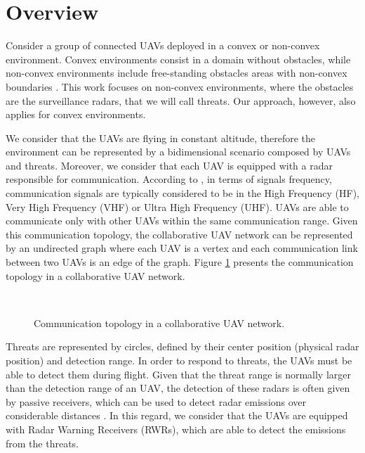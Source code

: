 \section{Overview}

Consider a group of connected UAVs deployed in a convex or non-convex environment. Convex environments consist in a domain without obstacles, while non-convex environments include  free-standing  obstacles  areas  with non-convex boundaries \cite{breitenmoser2010}. This work focuses on non-convex environments, where the obstacles are the surveillance radars, that we will call threats. Our approach, however, also applies for convex environments.

We consider that the UAVs are flying in constant altitude, therefore the environment can be represented by a bidimensional scenario composed by UAVs and threats. Moreover, we consider that each UAV is equipped with a radar responsible for communication. According to \cite{adamy2004}, in terms of signals frequency, communication signals are typically considered to be in the High Frequency (HF), Very High Frequency (VHF) or Ultra High Frequency (UHF). UAVs are able to communicate only with other UAVs within the same communication range. Given this communication topology, the collaborative UAV network can be represented by an undirected graph where each UAV is a vertex and each communication link between two UAVs is an edge of the graph. Figure \ref{fig:communicationLink} presents the communication topology in a collaborative UAV network.

\begin{figure}[hbt!]
      \centering            
         \\ \centering
       \caption{Communication topology in a collaborative UAV network.}
    \label{fig:communicationLink}
\end{figure}


Threats are represented by circles, defined by their center position (physical radar position) and detection range. In order to respond to threats, the UAVs must be able to detect them during flight. Given that the threat range is normally larger than the detection range of an UAV, the detection of these radars is often given by passive receivers, which can be used to detect radar emissions over considerable distances \cite{gross_2007}. In this regard, we consider that the UAVs are equipped with Radar Warning Receivers (RWRs), which are able to detect the emissions from the threats. 

